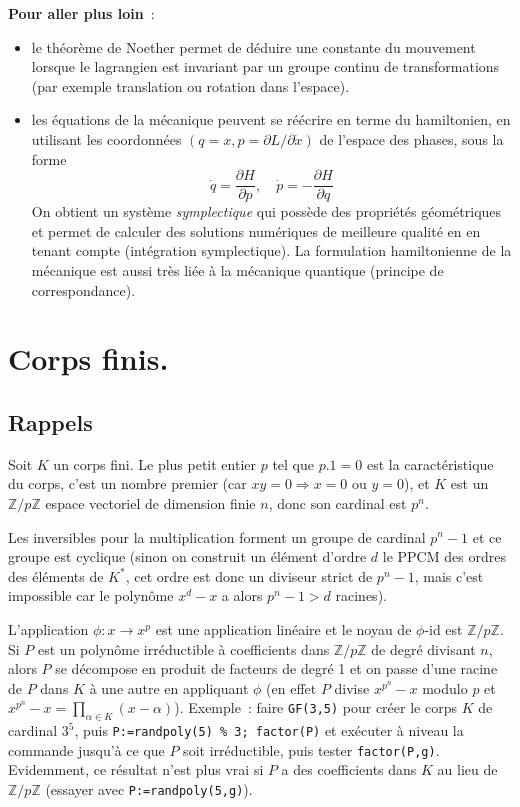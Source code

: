 \documentclass[a4paper,11pt]{article}
\begin{document}
\begin{giacjshere}
{\bf Pour aller plus loin}~:
\begin{itemize}
\item le th\'eor\`eme de Noether permet de d\'eduire une
constante du mouvement lorsque le lagrangien est invariant
par un groupe continu de transformations (par exemple
translation ou rotation dans l'espace).
\item les \'equations de la m\'ecanique peuvent se r\'e\'ecrire
en terme du hamiltonien, en utilisant 
les coordonn\'ees $(q=x,p=\partial L/\partial \dot{x})$
de l'espace des phases, sous la forme
$$ \dot{q}=\frac{\partial H}{\partial p}, \quad
\dot{p}=-\frac{\partial H}{\partial q}$$
On obtient un syst\`eme {\em symplectique}
qui poss\`ede des propri\'et\'es g\'eom\'etriques et permet
de calculer des solutions num\'eriques de meilleure qualit\'e en en tenant
compte (int\'egration symplectique). La formulation
hamiltonienne de la m\'ecanique est aussi tr\`es li\'ee \`a la 
m\'ecanique quantique (principe de correspondance).
\end{itemize}


\section{Corps finis.} \label{sec:gf}
\subsection{Rappels}
Soit $K$ un corps fini. Le plus petit entier $p$ tel que
$p.1=0$ est la caract\'eristique du corps, c'est un nombre premier
(car $xy=0 \Rightarrow x=0$ ou $y=0$), et $K$ est un $\mathbb{Z}/p\mathbb{Z}$
espace vectoriel de dimension finie $n$, donc son cardinal est $p^n$.

Les inversibles pour la multiplication forment un groupe de cardinal
$p^n-1$ et ce groupe est cyclique (sinon on construit un \'el\'ement
d'ordre $d$ le PPCM des ordres des \'el\'ements de $K^*$, cet ordre
est donc un diviseur strict de $p^n-1$, mais c'est impossible car
le polyn\^ome $x^d-x$ a alors $p^n-1>d$ racines).

L'application $\phi:x \rightarrow x^p$ est une application lin\'eaire
et le noyau de $\phi$-id est $\mathbb{Z}/p\mathbb{Z}$. Si $P$ est un polyn\^ome 
irr\'eductible \`a coefficients dans $\mathbb{Z}/p\mathbb{Z}$ de degr\'e divisant $n$, alors
$P$ se d\'ecompose en produit de facteurs de degr\'e 1 et on passe
d'une racine de $P$ dans $K$ \`a une autre en appliquant $\phi$
(en effet $P$ divise $x^{p^n}-x$ modulo $p$ et
$x^{p^n}-x=\prod_{\alpha \in K} (x-\alpha)$).
Exemple~: faire \verb|GF(3,5)| pour cr\'eer le corps $K$
de cardinal $3^5$, puis 
\verb|P:=randpoly(5) % 3; factor(P)|
et ex\'ecuter \`a niveau la commande jusqu'\`a ce que $P$ soit
irr\'eductible, puis tester \verb|factor(P,g)|.
Evidemment, ce r\'esultat n'est plus vrai si $P$ a des coefficients
dans $K$ au lieu de $\mathbb{Z}/p\mathbb{Z}$ (essayer avec \verb|P:=randpoly(5,g)|).


\end{giacjshere}
\end{document}
